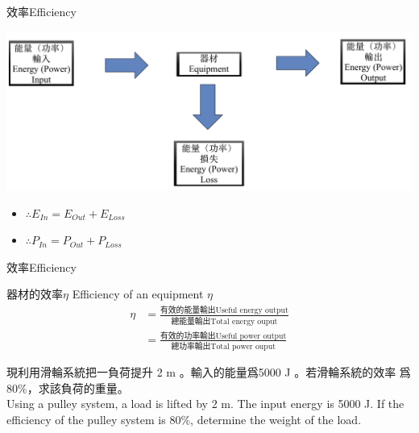 \documentclass[beamer=true]{standalone}
\begin{document}
\begin{frame}{效率Efficiency}
    \par
    {\par\centering
        \includegraphics[width=\textwidth]{assets/119333e7.png}
        \par}

    \begin{itemize}
        \item [] $\therefore E_{In} = E_{Out} + E_{Loss}$
        \item [] $\therefore P_{In} = P_{Out} + P_{Loss}$
    \end{itemize}
\end{frame}
\begin{frame}{效率Efficiency}
    \begin{exampleblock}
        {器材的效率$\eta$ Efficiency of an equipment $\eta$}
        \begin{align*}
            \eta & = \frac{\textrm{有效的能量輸出Useful energy output}}{\textrm{總能量輸出Total energy ouput}} \\
                 & =\frac{\textrm{有效的功率輸出Useful power output}}{\textrm{總功率輸出Total power ouput}}
        \end{align*}
    \end{exampleblock}
\end{frame}

\begin{eg}
    現利用滑輪系統把一負荷提升 2 m 。輸入的能量爲5000 J 。若滑輪系統的效率 爲 80\%，求該負荷的重量。\\Using a pulley system, a load is lifted by 2 m. The input energy is 5000 J. If the efficiency of the pulley system is 80\%, determine the weight of the load.
\end{eg}
\end{document}
